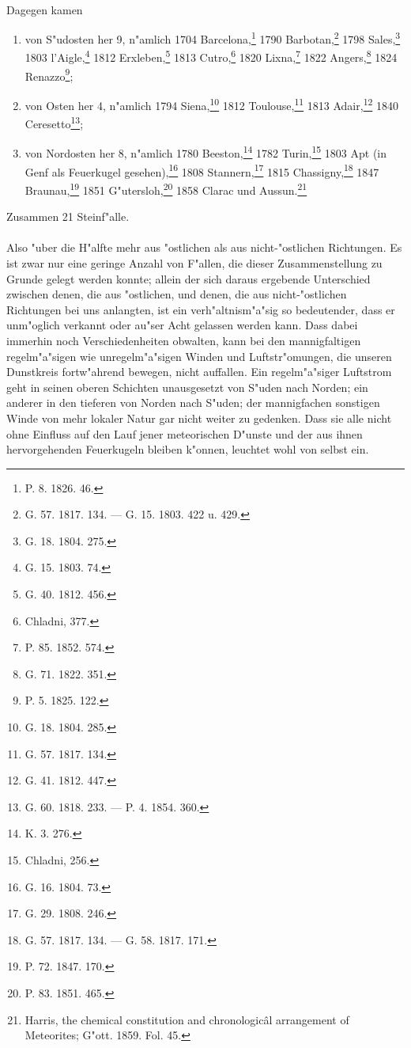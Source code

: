 \documentclass[a4paper, 8pt, oneside, polutonikogreek, german]{article}
\begin{document}
\paragraph{}
Dagegen kamen
\begin{enumerate}
    \item[4.] von S"udosten her 9, n"amlich 1704 Barcelona,\footnote{P. 8. 1826. 46.} 1790 Barbotan,\footnote{G. 57. 1817. 134. --- G. 15. 1803. 422 u. 429.} 1798 Sales,\footnote{G. 18. 1804. 275.} 1803 l'Aigle,\footnote{G. 15. 1803. 74.} 1812 Erxleben,\footnote{G. 40. 1812. 456.} 1813 Cutro,\footnote{Chladni, 377.} 1820 Lixna,\footnote{P. 85. 1852. 574.} 1822 Angers,\footnote{G. 71. 1822. 351.} 1824 Renazzo\footnote{P. 5. 1825. 122.};

    \item[5.] von Osten her 4, n"amlich 1794 Siena,\footnote{G. 18. 1804. 285.} 1812 Toulouse,\footnote{G. 57. 1817. 134.} 1813 Adair,\footnote{G. 41. 1812. 447.} 1840 Ceresetto\footnote{G. 60. 1818. 233. --- P. 4. 1854. 360.};

    \item[6.] von Nordosten her 8, n"amlich 1780 Beeston,\footnote{K. 3. 276.} 1782 Turin,\footnote{Chladni, 256.} 1803 Apt (in Genf als Feuerkugel gesehen),\footnote{G. 16. 1804. 73.} 1808 Stannern,\footnote{G. 29. 1808. 246.} 1815 Chassigny,\footnote{G. 57. 1817. 134. --- G. 58. 1817. 171.} 1847 Braunau,\footnote{P. 72. 1847. 170.} 1851 G"utersloh,\footnote{P. 83. 1851. 465.} 1858 Clarac und Aussun.\footnote{Harris, the chemical constitution and chronologicâl arrangement of Meteorites; G"ott. 1859. Fol. 45.}
\end{enumerate}
\begin{center}
Zusammen 21 Steinf"alle.
\end{center}
\paragraph{}
Also "uber die H"alfte mehr aus "ostlichen als aus nicht-"ostlichen Richtungen. Es ist zwar nur eine geringe Anzahl von F"allen, die dieser Zusammenstellung zu Grunde gelegt werden konnte; allein der sich daraus ergebende Unterschied zwischen denen, die aus "ostlichen, und denen, die aus nicht-"ostlichen Richtungen bei uns anlangten, ist ein verh"altnism"a"sig so bedeutender, dass er unm"oglich verkannt oder au"ser Acht gelassen werden kann. Dass dabei immerhin noch Verschiedenheiten obwalten, kann bei den mannigfaltigen regelm"a"sigen wie unregelm"a"sigen Winden und Luftstr"omungen, die unseren Dunstkreis fortw"ahrend bewegen, nicht auffallen. Ein regelm"a"siger Luftstrom geht in seinen oberen Schichten unausgesetzt von S"uden nach Norden; ein anderer in den tieferen von Norden nach S"uden; der mannigfachen sonstigen Winde von mehr lokaler Natur gar nicht weiter zu gedenken. Dass sie alle nicht ohne Einfluss auf den Lauf jener meteorischen D"unste und der aus ihnen hervorgehenden Feuerkugeln bleiben k"onnen, leuchtet wohl von selbst ein.
\end{document}
